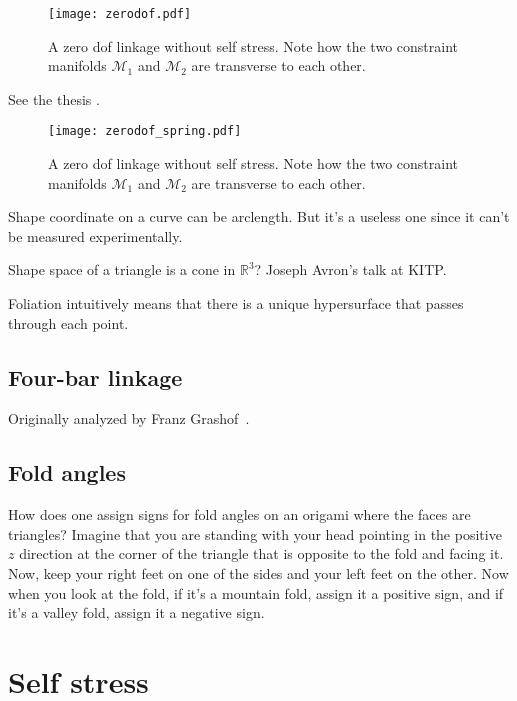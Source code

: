\begin{figure}
  \begin{center}
    \texttt{[image: zerodof.pdf]}
  \end{center}
\caption{A zero \ac{dof} linkage without self stress.  Note how the two constraint manifolds $\mathcal{M}_1$ and $\mathcal{M}_2$ are transverse to each other.}
  \label{fig:hello}
\end{figure}

See the thesis \cite{lengyel2002}.

\begin{figure}
  \begin{center}
    \texttt{[image: zerodof\_spring.pdf]}
  \end{center}
\caption[foo]{A zero \ac{dof} linkage without self stress.  Note how the two constraint manifolds $\mathcal{M}_1$ and $\mathcal{M}_2$ are transverse to each other.}
  \label{fig:hello2}
\end{figure}
\pagebreak

Shape coordinate on a curve can be arclength.  But it's a useless one since it can't be measured experimentally.

Shape space of a triangle is a cone in $\mathbb{R}^{3}$? Joseph Avron's talk at KITP.

Foliation intuitively means that there is a unique hypersurface that passes through each point.

\subsection{Four-bar linkage}

Originally analyzed by Franz Grashof~\cite[pp.~113--118]{grashof1883}.
\subsection{Fold angles}

How does one assign signs for fold angles on an origami where the faces are triangles?
Imagine that you are standing with your head pointing in the positive $z$ direction at the corner of the triangle that is opposite to the fold and facing it.
Now, keep your right feet on one of the sides and your left feet on the other.
Now when you look at the fold, if it's a mountain fold, assign it a positive sign, and if it's a valley fold, assign it a negative sign.

\section{Self stress}


